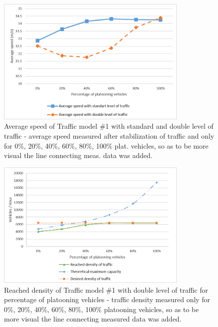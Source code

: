 \begin{figure}[ht]
\centering
\includegraphics[width=0.82\textwidth,height=0.80\textheight,keepaspectratio]{figures/Chapter_5/5_M1_avgSpeed.png}
\centering
\protect\caption[Average speed of Traffic model \#1 with standard and double level of traffic]{\label{fig:5_5-1}Average speed of Traffic model \#1 with standard and double level of traffic - average speed measured after stabilization of traffic and only for 0\%, 20\%, 40\%, 60\%, 80\%, 100\% plat. vehicles, so as to be more visual the line connecting meas. data was added.}
\end{figure}


\begin{figure}[!htbp]
\centering
\includegraphics[width=0.82\textwidth,height=0.80\textheight,keepaspectratio]{figures/Chapter_5/5_M1D_cap.png}
\centering
\protect\caption[Reached density of Traffic model \#1 with double level of traffic for  percentage of platooning vehicles]{\label{fig:5_5-2}Reached density of Traffic model \#1 with double level of traffic for percentage of platooning vehicles - traffic density measured only for 0\%, 20\%, 40\%, 60\%, 80\%, 100\% platooning vehicles, so as to be more visual the line connecting measured data was added.}
\end{figure}

















